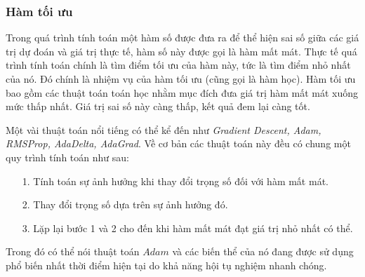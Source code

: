 \documentclass[12pt,a4paper]{report}
\begin{document}
\subsubsection{Hàm tối ưu}
Trong quá trình tính toán một hàm số được đưa ra để thể hiện sai số giữa các giá trị dự đoán và giá trị thực tế, hàm số này được gọi là hàm mất mát. Thực tế quá trình tính toán chính là tìm điểm tối ưu của hàm này, tức là tìm điểm nhỏ nhất của nó. Đó chính là nhiệm vụ của hàm tối ưu (cũng gọi là hàm học). Hàm tối ưu bao gồm các thuật toán toán học nhằm mục đích đưa giá trị hàm mất mát xuống mức thấp nhất. Giá trị sai số này càng thấp, kết quả đem lại càng tốt.

Một vài thuật toán nổi tiếng có thể kể đến như \textit{Gradient Descent, Adam, RMSProp, AdaDelta, AdaGrad}. Về cơ bản các thuật toán này đều có chung một quy trình tính toán như sau:
	\begin{itemize}
		\item[1.] Tính toán sự ảnh hưởng khi thay đổi trọng số đối với hàm mất mát.
		\item[2.] Thay đổi trọng số dựa trên sự ảnh hưởng đó.
		\item[3.] Lặp lại bước 1 và 2 cho đến khi hàm mất mát đạt giá trị nhỏ nhất có thể.
	\end{itemize}
Trong đó có thể nói thuật toán $Adam$ và các biến thể của nó đang được sử dụng phổ biến nhất thời điểm hiện tại do khả năng hội tụ nghiệm nhanh chóng.\\
\end{document}
